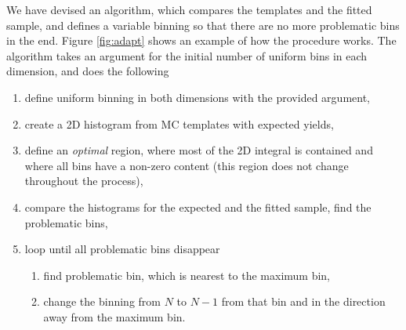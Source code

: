 We have devised an algorithm, which compares the templates and the fitted sample, and defines a variable binning so that there are no more problematic bins in the end. Figure \ref{fig:adapt} shows an example of how the procedure works. The algorithm takes an argument for the initial number of uniform bins in each dimension, and does the following
\begin{enumerate}
\item define uniform binning in both dimensions with the provided argument,
\item create a 2D histogram from MC templates with expected yields,
\item define an \textit{optimal} region, where most of the 2D integral is contained and where all bins have a non-zero content (this region does not change throughout the process),
\item compare the histograms for the expected and the fitted sample, find the problematic bins,
\item loop until all problematic bins disappear
	\begin{enumerate}
	\item find problematic bin, which is nearest to the maximum bin,
	\item change the binning from $N$ to $N-1$ from that bin and in the direction away from the maximum bin.
	\end{enumerate}
\end{enumerate}

